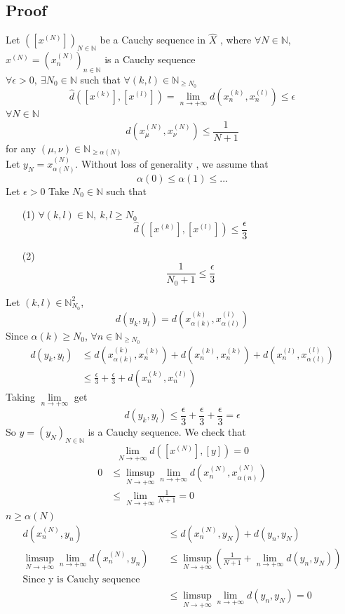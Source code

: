 \documentclass{book}
\begin{document}
\subsection*{Proof}
Let $([x^{(N)}])_{N\in \mathbb{N}}$ be a Cauchy sequence in $\hat{X}$ , where $\forall N\in\mathbb{N}$, $ x^{(N)}=(x_n^{(N)})_{n\in \mathbb{N}}$ is a Cauchy sequence
\\ $\forall \epsilon>0,\ \exists N_0\in \mathbb{N}$ such that $\forall(k,l)\in \mathbb{N}_{\geq N_0}$
$$\hat{d}([x^{(k)}],[x^{(l)}])=\lim\limits_{n\rightarrow+\infty}d(x_n^{(k)},x_n^{(l)})\leq \epsilon$$
$\forall N\in \mathbb{N}$$$d(x_\mu^{(N)},x_\nu ^{(N)})\leq\frac{1}{N+1}$$ for any $(\mu,\nu)\in \mathbb{N}_{\geq \alpha(N)}$\\
Let $y_N=x_{\alpha(N)}^{(N)}$. Without loss of generality , we assume that $$\alpha(0)\leq\alpha(1)\leq...$$
Let $\epsilon>0$ Take $N_0\in \mathbb{N}$ such that \begin{itemize}
    \item [(1)]$\forall (k,l)\in \mathbb{N},\ k,l\geq N_0$$$\hat{d}([x^{(k)}],[x^{(l)}])\leq\frac{\epsilon}{3}$$
    \item [(2)]$$\frac{1}{N_0+1}\leq\frac{\epsilon}{3}$$
\end{itemize}
Let $(k,l)\in \mathbb{N}_{N_0}^2$,$$d(y_k,y_l)=d(x_{\alpha(k)}^{(k)},x_{\alpha(l)}^{(l)})$$
Since $\alpha(k)\geq N_0$, $\forall n\in \mathbb{N}_{\geq N_0}$
$$
\begin{aligned}
    d(y_k,y_l)&\leq d(x_{\alpha(k)}^{(k)},x_n^{(k)})+d(x_n^{(k)},x_n^{(k)})+d(x_n^{(l)},x^{(l)}_{\alpha(l)})\\ 
    &\leq \frac{\epsilon}{3}+\frac{\epsilon}{3}+d(x_n^{(k)},x_n^{(l)})
\end{aligned}$$
Taking $\lim\limits_{n\rightarrow+\infty}$ get $$d(y_k,y_l)\leq\frac{\epsilon}{3}+\frac{\epsilon}{3}+\frac{\epsilon}{3}=\epsilon$$
So $y=(y_N)_{N\in \mathbb{N}}$ is a Cauchy sequence. We check that $$\lim\limits_{N\rightarrow+\infty}\hat{d}([x^{(N)}],[y])=0$$
$$\begin{aligned}
    0&\leq\limsup\limits_{N\rightarrow+\infty}\lim\limits_{n\rightarrow+\infty}d(x_n^{(N)},x_{\alpha(n)}^{(N)})\\
    &\leq \lim\limits_{N\rightarrow+\infty}\frac{1}{N+1}= 0
\end{aligned}$$
$n\geq \alpha(N)$
$$\begin{aligned}
    d(x_n^{(N)},y_n) &\leq d(x_n^{(N)},y_N)+d(y_n,y_N)\\
    \limsup\limits_{N\rightarrow+\infty}\lim\limits_{n\rightarrow+\infty}d(x_n^{(N)},y_n)&\leq \limsup\limits_{N\rightarrow+\infty}(\frac{1}{N+1}+\lim\limits_{n\rightarrow+\infty}d(y_n,y_N))\\
    \text{Since y is Cauchy sequence}\qquad& \\
    &\leq \limsup\limits_{N\rightarrow+\infty}\lim\limits_{n\rightarrow+\infty}d(y_n,y_N)=0
\end{aligned}$$
\end{document}
